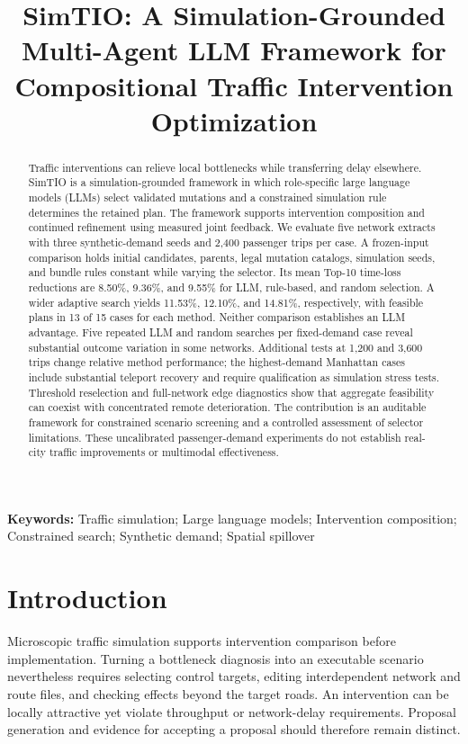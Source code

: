 \documentclass[11pt]{article}
\title{SimTIO: A Simulation-Grounded Multi-Agent LLM Framework for Compositional Traffic Intervention Optimization}
\author{}
\date{}
\begin{document}
\maketitle
\begin{abstract}
Traffic interventions can relieve local bottlenecks while transferring delay elsewhere. SimTIO is a simulation-grounded framework in which role-specific large language models (LLMs) select validated mutations and a constrained simulation rule determines the retained plan. The framework supports intervention composition and continued refinement using measured joint feedback. We evaluate five network extracts with three synthetic-demand seeds and 2,400 passenger trips per case. A frozen-input comparison holds initial candidates, parents, legal mutation catalogs, simulation seeds, and bundle rules constant while varying the selector. Its mean Top-10 time-loss reductions are 8.50\%, 9.36\%, and 9.55\% for LLM, rule-based, and random selection. A wider adaptive search yields 11.53\%, 12.10\%, and 14.81\%, respectively, with feasible plans in 13 of 15 cases for each method. Neither comparison establishes an LLM advantage. Five repeated LLM and random searches per fixed-demand case reveal substantial outcome variation in some networks. Additional tests at 1,200 and 3,600 trips change relative method performance; the highest-demand Manhattan cases include substantial teleport recovery and require qualification as simulation stress tests. Threshold reselection and full-network edge diagnostics show that aggregate feasibility can coexist with concentrated remote deterioration. The contribution is an auditable framework for constrained scenario screening and a controlled assessment of selector limitations. These uncalibrated passenger-demand experiments do not establish real-city traffic improvements or multimodal effectiveness.
\end{abstract}
\noindent\textbf{Keywords:} Traffic simulation; Large language models; Intervention composition; Constrained search; Synthetic demand; Spatial spillover

\section{Introduction}
Microscopic traffic simulation supports intervention comparison before implementation. Turning a bottleneck diagnosis into an executable scenario nevertheless requires selecting control targets, editing interdependent network and route files, and checking effects beyond the target roads. An intervention can be locally attractive yet violate throughput or network-delay requirements. Proposal generation and evidence for accepting a proposal should therefore remain distinct.
\end{document}
